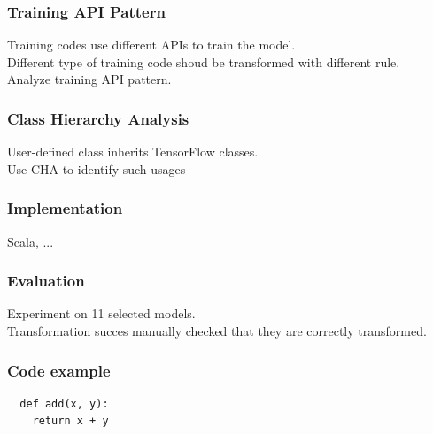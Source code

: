 \documentclass{beamer}
\begin{document}
\begin{frame}
  \frametitle{Training API Pattern}
  Training codes use different APIs to train the model.\\
  Different type of training code shoud be transformed with different rule.\\
  Analyze training API pattern.
\end{frame}


\begin{frame}
  \frametitle{Class Hierarchy Analysis}
  User-defined class inherits TensorFlow classes.\\
  Use CHA to identify such usages
\end{frame}


\begin{frame}
  \frametitle{Implementation}
  Scala, ...
\end{frame}


\begin{frame}
  \frametitle{Evaluation}
  Experiment on 11 selected models.\\
  Transformation succes
  manually checked that they are correctly transformed.\\
\end{frame}


\begin{frame}[fragile]
  \frametitle{Code example}
  \begin{verbatim}
  def add(x, y):
    return x + y
  \end{verbatim}
\end{frame}
\end{document}
